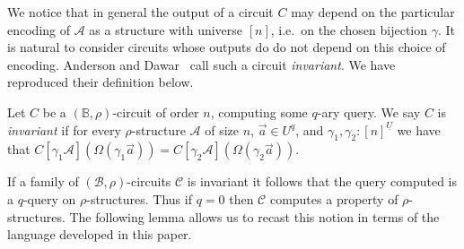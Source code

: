 \documentclass[../main/thesis.tex]{subfiles}
\begin{document}
We notice that in general the output of a circuit $C$ may depend on the
particular encoding of $\mathcal{A}$ as a structure with universe $[n]$, i.e.\
on the chosen bijection $\gamma$. It is natural to consider circuits whose
outputs do do not depend on this choice of encoding. Anderson and
Dawar~\cite{AndersonD17} call such a circuit \emph{invariant}. We have
reproduced their definition below.

\begin{definition}
  Let $C$ be a $(\mathbb{B}, \rho)$-circuit of order $n$, computing some $q$-ary
  query. We say $C$ is \emph{invariant} if for every $\rho$-structure
  $\mathcal{A}$ of size $n$, $\vec{a} \in U^{q}$, and $\gamma_1, \gamma_2:
  [n]^{\underline{U}}$ we have that $C[\gamma_1 \mathcal{A}](\Omega (\gamma_1
  \vec{a})) = C[\gamma_2 \mathcal{A}](\Omega (\gamma_2 \vec{a}))$.
\end{definition}

If a family of $(\mathcal{B}, \rho)$-circuits $\mathcal{C}$ is invariant it
follows that the query computed is a $q$-query on $\rho$-structures. Thus if $q
= 0$ then $\mathcal{C}$ computes a property of $\rho$-structures. The following
lemma allows us to recast this notion in terms of the language developed in this
paper.
\end{document}
